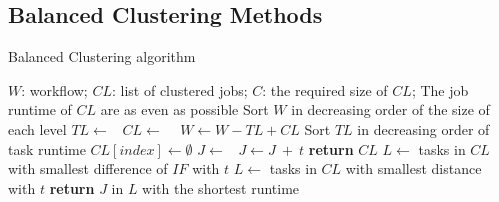 


\subsection{Balanced Clustering Methods}


\begin{algorithm}[tb]
\caption{ Balanced Clustering algorithm}
\label{alg:admit}
\begin{algorithmic}[1]
\Require $W$: workflow; $CL$: list of clustered jobs; $C$: the required size of $CL$; 
\Ensure The job runtime of $CL$ are as even as possible
\State Sort $W$ in decreasing order of the size of each level
       \State $TL\gets $\  
       \State $CL\gets$  \  
       \State $W \gets W - TL + CL$   
   \EndFor
\EndProcedure
{}
    \State Sort $TL$ in decreasing order of task runtime
        \State $CL[index] \gets \emptyset$
    \EndFor
        \State $J \gets $\  
        \State  $J \gets J\ +\ t$ 
    \EndFor
    \State \textbf{return} $CL$
\EndProcedure
{}
\State $L \gets$ tasks in $CL$ with smallest difference of $IF$ with $t$
\EndIf
{}
\State $L \gets$ tasks in $CL$ with smallest distance with $t$ 
\EndIf
\State \textbf{return} $J$ in $L$ with the shortest runtime 
\EndProcedure
\end{algorithmic}
\end{algorithm}


